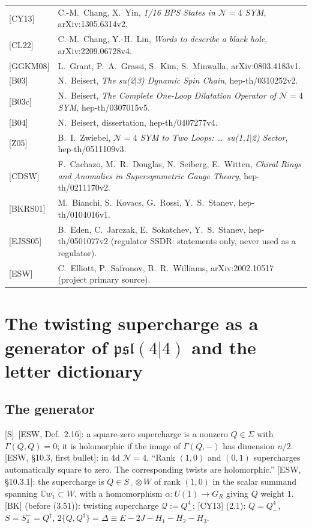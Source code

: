 \documentclass[11pt]{article}
\theoremstyle{definition}
\newcommand{\Sl}{\textup{[S]}}
\begin{document}
\begin{longtable}{p{2.3cm}p{13.7cm}}
{[CY13]} & C.-M.~Chang, X.~Yin, \emph{1/16 BPS States in $\mathcal N=4$ SYM}, arXiv:1305.6314v2.\\
{[CL22]} & C.-M.~Chang, Y.-H.~Lin, \emph{Words to describe a black hole}, arXiv:2209.06728v4.\\
{[GGKM08]} & L.~Grant, P.~A.~Grassi, S.~Kim, S.~Minwalla, arXiv:0803.4183v1.\\
{[B03]} & N.~Beisert, \emph{The su(2$|$3) Dynamic Spin Chain}, hep-th/0310252v2.\\
{[B03c]} & N.~Beisert, \emph{The Complete One-Loop Dilatation Operator of $\mathcal N=4$ SYM}, hep-th/0307015v5.\\
{[B04]} & N.~Beisert, dissertation, hep-th/0407277v4.\\
{[Z05]} & B.~I.~Zwiebel, \emph{$\mathcal N=4$ SYM to Two Loops: \dots\ su(1,1$|$2) Sector}, hep-th/0511109v3.\\
{[CDSW]} & F.~Cachazo, M.~R.~Douglas, N.~Seiberg, E.~Witten, \emph{Chiral Rings and Anomalies in Supersymmetric Gauge Theory}, hep-th/0211170v2.\\
{[BKRS01]} & M.~Bianchi, S.~Kovacs, G.~Rossi, Y.~S.~Stanev, hep-th/0104016v1.\\
{[EJSS05]} & B.~Eden, C.~Jarczak, E.~Sokatchev, Y.~S.~Stanev, hep-th/0501077v2 (regulator SSDR: statements only, never used as a regulator).\\
{[ESW]} & C.~Elliott, P.~Safronov, B.~R.~Williams, arXiv:2002.10517 (project primary source).
\end{longtable}

\section{The twisting supercharge as a generator of $\mathfrak{psl}(4|4)$ and the letter dictionary}

\subsection{The generator}

\Sl\ [ESW, Def.~2.16]: a square-zero supercharge is a nonzero $Q\in\Sigma$ with $\Gamma(Q,Q)=0$; it is holomorphic if the image of $\Gamma(Q,-)$ has dimension $n/2$. [ESW, \S10.3, first bullet]: in 4d $\mathcal N=4$, ``Rank $(1,0)$ and $(0,1)$ supercharges automatically square to zero. The corresponding twists are holomorphic.'' [ESW, \S10.3.1]: the supercharge is $Q\in S_+\otimes W$ of rank $(1,0)$ in the scalar summand spanning $\mathbb Cw_1\subset W$, with a homomorphism $\alpha:U(1)\to G_R$ giving $Q$ weight $1$. [BK] (before (3.51)): twisting supercharge $\mathcal Q:=Q^4_-$; [CY13] (2.1): $Q=Q^4_-$, $S=S^-_4=Q^\dagger$, $2\{Q,Q^\dagger\}=\Delta\equiv E-2J-H_1-H_2-H_3$.
\end{document}
